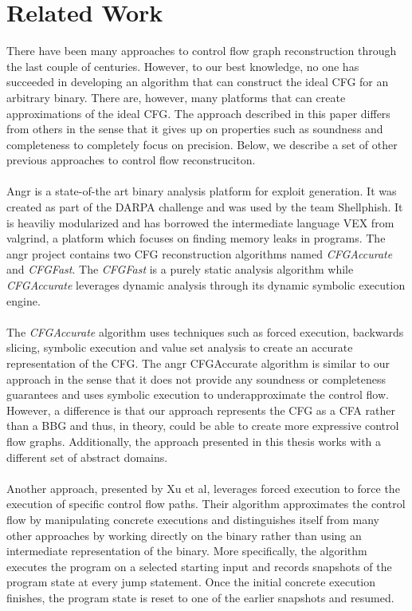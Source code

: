 \documentclass{kththesis}
\begin{document}
\section{Related Work}
There have been many approaches to control flow graph reconstruction through the last couple of centuries. However, to our best knowledge, no one has succeeded in developing an algorithm that can construct the ideal CFG for an arbitrary binary. There are, however, many platforms that can create approximations of the ideal CFG. The approach described in this paper differs from others in the sense that it gives up on properties such as soundness and completeness to completely focus on precision. Below, we describe a set of other previous approaches to control flow reconstruciton.
\\ \\
Angr\cite{angr} is a state-of-the art binary analysis platform for exploit generation. It was created as part of the DARPA challenge and was used by the team Shellphish. It is heaviliy modularized and has borrowed the intermediate language VEX from valgrind, a platform which focuses on finding memory leaks in programs. The angr project contains two CFG reconstruction algorithms named \textit{CFGAccurate} and \textit{CFGFast}. The \textit{CFGFast} is a purely static analysis algorithm while \textit{CFGAccurate} leverages dynamic analysis through its dynamic symbolic execution engine. 
\\ \\
The \textit{CFGAccurate} algorithm uses techniques such as forced execution, backwards slicing, symbolic execution and value set analysis to create an accurate representation of the CFG. The angr CFGAccurate algorithm is similar to our approach in the sense that it does not provide any soundness or completeness guarantees and uses symbolic execution to underapproximate the control flow. However, a difference is that our approach represents the CFG as a CFA rather than a BBG and thus, in theory, could be able to create more expressive control flow graphs. Additionally, the approach presented in this thesis works with a different set of abstract domains.
\\ \\
Another approach, presented by Xu et al\cite{preciseCFG}, leverages forced execution to force the execution of specific control flow paths. Their algorithm approximates the control flow by manipulating concrete executions and distinguishes itself from many other approaches by working directly on the binary rather than using an intermediate representation of the binary. More specifically, the algorithm executes the program on a selected starting input and records snapshots of the program state at every jump statement. Once the initial concrete execution finishes, the program state is reset to one of the earlier snapshots and resumed. 
\end{document}
